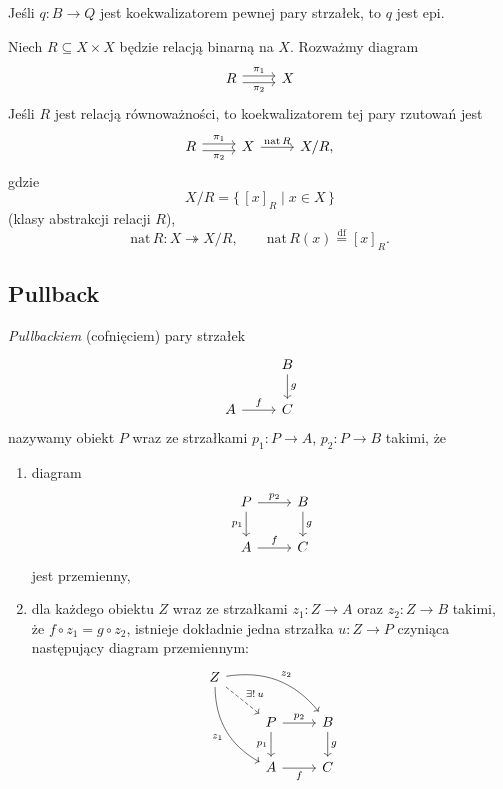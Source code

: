 \begin{stwierdzenie}
Jeśli $q\colon B\to Q$ jest koekwalizatorem pewnej pary strzałek, to $q$ jest epi.
\end{stwierdzenie}

\begin{przyklad}
Niech $R\subseteq X\times X$ będzie relacją binarną na $X$. Rozważmy diagram
\[\begin{tikzcd}
R \arrow[r,shift left,"\pi_1"] \arrow[r,shift right,swap,"\pi_2"] & X
\end{tikzcd}\]
Jeśli $R$ jest relacją równoważności, to koekwalizatorem tej pary rzutowań jest
\[\begin{tikzcd}
R \arrow[r,shift left,"\pi_1"] \arrow[r,shift right,swap,"\pi_2"] & X \arrow[r,"\mathrm{nat}\,R"] & X/R,
\end{tikzcd}\]
gdzie
\[
X/R = \{\,[x]_R \mid x\in X\,\}
\]
(klasy abstrakcji relacji $R$),
\[
\mathrm{nat}\,R\colon X \twoheadrightarrow X/R, \qquad \mathrm{nat}\,R(x) \stackrel{\mathrm{df}}{=} [x]_R.
\]
\end{przyklad}

\subsection*{Pullback}

\begin{definicja}
\emph{Pullbackiem} (cofnięciem) pary strzałek
\[\begin{tikzcd}
& B \arrow[d,"g"] \\
A \arrow[r,"f"] & C
\end{tikzcd}\]
nazywamy obiekt $P$ wraz ze strzałkami $p_1\colon P\to A$, $p_2\colon P\to B$ takimi, że
\begin{enumerate}
\item diagram
\[\begin{tikzcd}
P \arrow[r,"p_2"] \arrow[d,swap,"p_1"] & B \arrow[d,"g"] \\
A \arrow[r,"f"] & C
\end{tikzcd}\]
jest przemienny,
\item dla każdego obiektu $Z$ wraz ze strzałkami $z_1\colon Z\to A$ oraz $z_2\colon Z\to B$ takimi, że $f\circ z_1 = g\circ z_2$, istnieje dokładnie jedna strzałka $u\colon Z\to P$ czyniąca następujący diagram przemiennym:
\[\begin{tikzcd}
Z \arrow[drr,bend left,"z_2"] \arrow[ddr,bend right,swap,"z_1"] \arrow[dr,dashed,"\exists !\, u"] & & \\
& P \arrow[r,"p_2"] \arrow[d,swap,"p_1"] & B \arrow[d,"g"] \\
& A \arrow[r,swap,"f"] & C
\end{tikzcd}\]
\end{enumerate}
\end{definicja}

